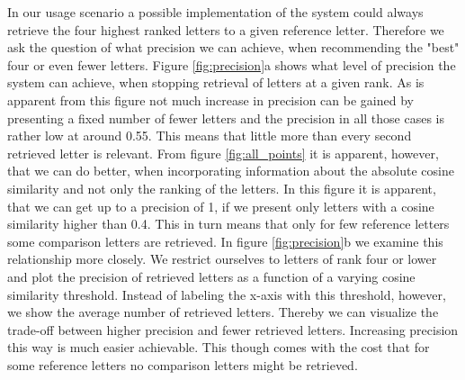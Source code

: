 In our usage scenario a possible implementation of the system could always retrieve the four highest ranked letters to a given reference letter. Therefore we ask the question of what precision we can achieve, when recommending the "best" four or even fewer letters. Figure \ref{fig:precision}a shows what level of precision the system can achieve, when stopping retrieval of letters at a given rank. As is apparent from this figure not much increase in precision can be gained by presenting a fixed number of fewer letters and the precision in all those cases is rather low at around 0.55. This means that little more than every second retrieved letter is relevant. From figure \ref{fig:all_points} it is apparent, however, that we can do better, when incorporating information about the absolute cosine similarity and not only the ranking of the letters. In this figure it is apparent, that we can get up to a precision of 1, if we present only letters with a cosine similarity higher than 0.4. This in turn means that only for few reference letters some comparison letters are retrieved. In figure \ref{fig:precision}b we examine this relationship more closely. We restrict ourselves to letters of rank four or lower and plot the precision of retrieved letters as a function of a varying cosine similarity threshold. Instead of labeling the x-axis with this threshold, however, we show the average number of retrieved letters. Thereby we can visualize the trade-off between higher precision and fewer retrieved letters. Increasing precision this way is much easier achievable. This though comes with the cost that for some reference letters no comparison letters might be retrieved.

